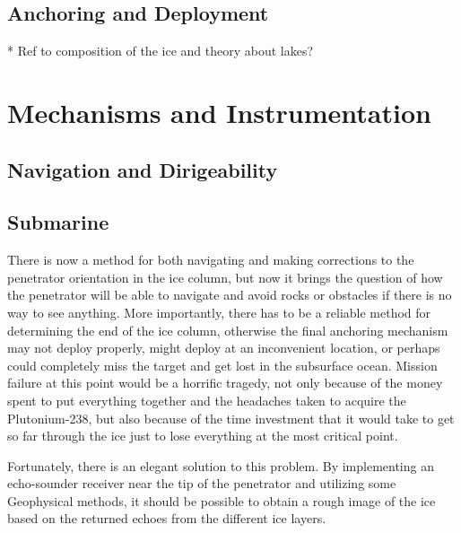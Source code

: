 

\subsection{Anchoring and Deployment}

* Ref to composition of the ice and theory about lakes?

\section{Mechanisms and Instrumentation}

\subsection{Navigation and Dirigeability}

\subsection{Submarine}

There is now a method for both navigating and making corrections to the penetrator orientation in the ice column, but now it brings the question of how the penetrator will be able to navigate and avoid rocks or obstacles if there is no way to see anything. More importantly, there has to be a reliable method for determining the end of the ice column, otherwise the final anchoring mechanism may not deploy properly, might deploy at an inconvenient location, or perhaps could completely miss the target and get lost in the subsurface ocean. Mission failure at this point would be a horrific tragedy, not only because of the money spent to put everything together and the headaches taken to acquire the Plutonium-238, but also because of the time investment that it would take to get so far through the ice just to lose everything at the most critical point.

Fortunately, there is an elegant solution to this problem. By implementing an echo-sounder receiver near the tip of the penetrator and utilizing some Geophysical methods, it should be possible to obtain a rough image of the ice based on the returned echoes from the different ice layers. 




